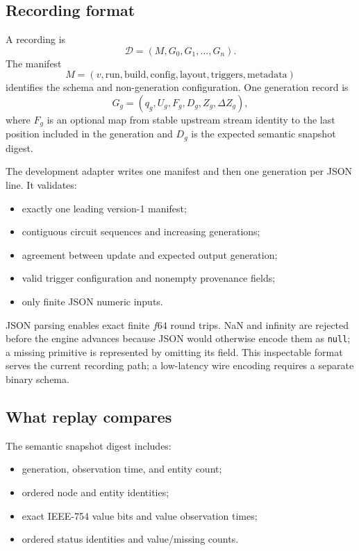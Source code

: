 \documentclass{strategynet-journal}
\begin{document}
\begin{SNcolumns}

\subsection{Recording format}

A recording is
\[
  \mathcal D=(M,G_0,G_1,\ldots,G_n).
\]
The manifest
\[
  M=(v,\mathrm{run},\mathrm{build},\mathrm{config},
     \mathrm{layout},\mathrm{triggers},\mathrm{metadata})
\]
identifies the schema and non-generation configuration.  One generation
record is
\[
  G_g=(q_g,U_g,F_g,D_g,Z_g,\Delta Z_g),
\]
where \(F_g\) is an optional map from stable upstream stream identity to the
last position included in the generation and \(D_g\) is the expected semantic
snapshot digest.

The development adapter writes one manifest and then one generation per JSON
line.  It validates:
\begin{itemize}
  \item exactly one leading version-1 manifest;
  \item contiguous circuit sequences and increasing generations;
  \item agreement between update and expected output generation;
  \item valid trigger configuration and nonempty provenance fields;
  \item only finite JSON numeric inputs.
\end{itemize}

JSON parsing enables exact finite \(f64\) round trips.  NaN and infinity are
rejected before the engine advances because JSON would otherwise encode them
as \texttt{null}; a missing primitive is represented by omitting its field.
This inspectable format serves the current recording path; a low-latency wire
encoding requires a separate binary schema.

\subsection{What replay compares}

The semantic snapshot digest includes:
\begin{itemize}
  \item generation, observation time, and entity count;
  \item ordered node and entity identities;
  \item exact IEEE-754 value bits and value observation times;
  \item ordered status identities and value/missing counts.
\end{itemize}


\end{SNcolumns}
\end{document}
